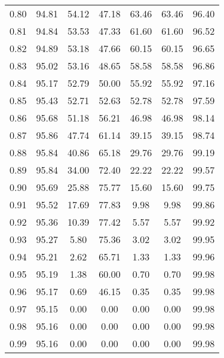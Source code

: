 \begin{tabular}{|c|c|c|c|c|c|c|}
      0.80 &     94.81 &     54.12 &      47.18 &   63.46 &      63.46 &         96.40 \\
      0.81 &     94.84 &     53.53 &      47.33 &   61.60 &      61.60 &         96.52 \\
      0.82 &     94.89 &     53.18 &      47.66 &   60.15 &      60.15 &         96.65 \\
      0.83 &     95.02 &     53.16 &      48.65 &   58.58 &      58.58 &         96.86 \\
      0.84 &     95.17 &     52.79 &      50.00 &   55.92 &      55.92 &         97.16 \\
      0.85 &     95.43 &     52.71 &      52.63 &   52.78 &      52.78 &         97.59 \\
      0.86 &     95.68 &     51.18 &      56.21 &   46.98 &      46.98 &         98.14 \\
      0.87 &     95.86 &     47.74 &      61.14 &   39.15 &      39.15 &         98.74 \\
      0.88 &     95.84 &     40.86 &      65.18 &   29.76 &      29.76 &         99.19 \\
      0.89 &     95.84 &     34.00 &      72.40 &   22.22 &      22.22 &         99.57 \\
      0.90 &     95.69 &     25.88 &      75.77 &   15.60 &      15.60 &         99.75 \\
      0.91 &     95.52 &     17.69 &      77.83 &    9.98 &       9.98 &         99.86 \\
      0.92 &     95.36 &     10.39 &      77.42 &    5.57 &       5.57 &         99.92 \\
      0.93 &     95.27 &      5.80 &      75.36 &    3.02 &       3.02 &         99.95 \\
      0.94 &     95.21 &      2.62 &      65.71 &    1.33 &       1.33 &         99.96 \\
      0.95 &     95.19 &      1.38 &      60.00 &    0.70 &       0.70 &         99.98 \\
      0.96 &     95.17 &      0.69 &      46.15 &    0.35 &       0.35 &         99.98 \\
      0.97 &     95.15 &      0.00 &       0.00 &    0.00 &       0.00 &         99.98 \\
      0.98 &     95.16 &      0.00 &       0.00 &    0.00 &       0.00 &         99.98 \\
      0.99 &     95.16 &      0.00 &       0.00 &    0.00 &       0.00 &         99.98 \\
\bottomrule
\end{tabular}
